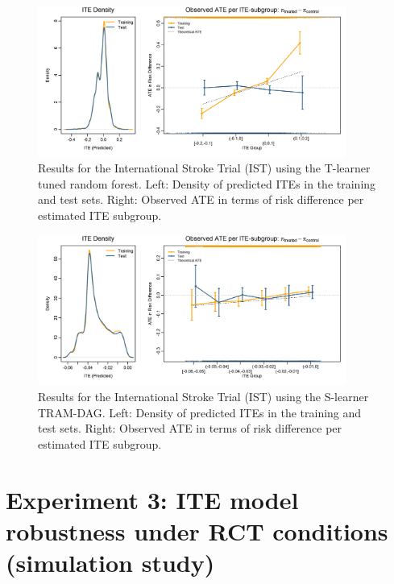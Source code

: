 \begin{figure}[htbp]
\centering
\includegraphics[width=0.9\textwidth]{img/results_IST/IST_tuned_rf_tlearner_density_ITE_ATE.png}
\caption{Results for the International Stroke Trial (IST) using the T-learner tuned random forest. Left: Density of predicted ITEs in the training and test sets. Right: Observed ATE in terms of risk difference per estimated ITE subgroup.}
\label{fig:IST_density_ITE_ATE_tuned_rf}
\end{figure}


\begin{figure}[htbp]
\centering
\includegraphics[width=0.9\textwidth]{img/results_IST/IST_TRAM_DAG_slearner_density_ITE_ATE.png}
\caption{Results for the International Stroke Trial (IST) using the S-learner TRAM-DAG. Left: Density of predicted ITEs in the training and test sets. Right: Observed ATE in terms of risk difference per estimated ITE subgroup.}
\label{fig:IST_density_ITE_ATE_TRAM_DAG}
\end{figure}



\clearpage

 

\section{Experiment 3: ITE model robustness under RCT conditions (simulation study)} \label{sec:results_experiment3}

